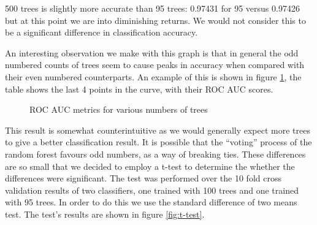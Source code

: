 \documentclass[ %
                    author={Sam Phippen},
                supervisor={Dr. Rafal Bogacz},
                     title={Real time voice activity detectors in noisy personal computing environments},
                  subtitle={},
                    degree={MEng},
                      year={2012} ]{thesis}
\begin{document}
500 trees is slightly more accurate than 95 trees: 0.97431 for 95 versus
0.97426 but at this point we are into diminishing returns. We would not consider
this to be a significant difference in classification accuracy.

An interesting observation we make with this graph is that in general the odd
numbered counts of trees seem to cause peaks in accuracy when compared with
their even numbered counterparts. An example of this is shown in figure
\ref{table:roc_spike}, the table shows the last 4 points in the curve, with
their ROC AUC scores.

\begin{figure}
    \caption{ROC AUC metrics for various numbers of trees}
    \label{table:roc_spike}
\end{figure}

This result is somewhat counterintuitive as we would generally expect more
trees to give a better classification result. It is possible that the
``voting'' process of the random forest favours odd numbers, as a way of
breaking ties.  These differences are so small that we decided to employ a
t-test to determine the whether the differences were significant. The test was
performed over the 10 fold cross validation results of two classifiers, one
trained with 100 trees and one trained with 95 trees. In order to do this we
use the standard difference of two means test. The test's results are shown in
figure \ref{fig:t-test}.
\end{document}
